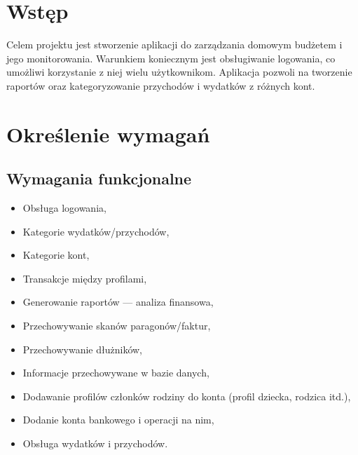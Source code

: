 \documentclass[12pt,a4paper,oneside]{article}
\begin{document}
\thispagestyle{empty}
\tableofcontents
\newpage

\section{Wstęp}
Celem projektu jest stworzenie aplikacji do zarządzania domowym budżetem i jego
monitorowania. Warunkiem koniecznym jest obsługiwanie logowania, co umożliwi
korzystanie z niej wielu użytkownikom. Aplikacja pozwoli na tworzenie raportów
oraz kategoryzowanie przychodów i wydatków z różnych kont.

\section{Określenie wymagań}
\subsection{Wymagania funkcjonalne}
\begin{itemize}
    \item Obsługa logowania,
    \item Kategorie wydatków/przychodów,
    \item Kategorie kont,
    \item Transakcje między profilami,
    \item Generowanie raportów — analiza finansowa,
    \item Przechowywanie skanów paragonów/faktur,
    \item Przechowywanie dłużników,
    \item Informacje przechowywane w bazie danych,
    \item Dodawanie profilów członków rodziny do konta (profil dziecka, rodzica
          itd.),
    \item Dodanie konta bankowego i operacji na nim,
    \item Obsługa wydatków i przychodów.
\end{itemize}
\end{document}
